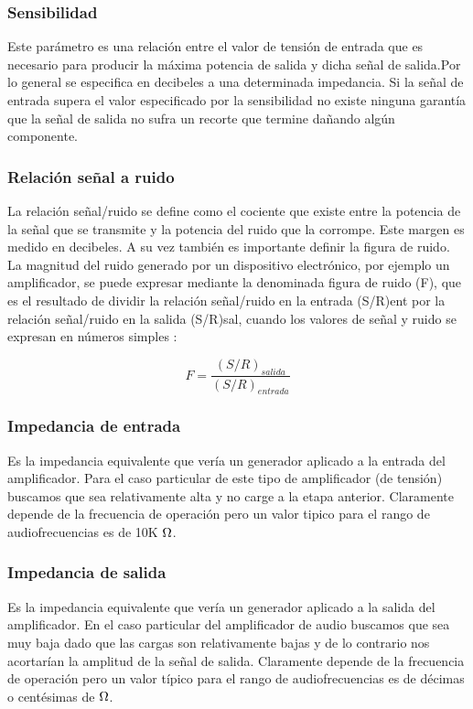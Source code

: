\subsubsection{Sensibilidad}

Este parámetro es una relación entre el valor de tensión de entrada que es necesario para producir la máxima potencia de salida y dicha señal de salida.Por lo general se especifica en decibeles a una determinada impedancia. Si la señal de entrada supera el valor especificado por la sensibilidad no existe ninguna garantía que la señal de salida no sufra un recorte que termine dañando algún componente.
\medskip 
\subsubsection{Relación señal a ruido}

La relación señal/ruido se define como el cociente que existe entre la potencia de la señal que se transmite y la potencia del ruido que la corrompe. Este margen es medido en decibeles. A su vez también es importante definir la figura de ruido. La magnitud del ruido generado por un dispositivo electrónico, por ejemplo un amplificador, se puede expresar mediante la denominada figura de ruido (F), que es el resultado de dividir la relación señal/ruido en la entrada (S/R)ent por la relación señal/ruido en la salida (S/R)sal, cuando los valores de señal y ruido se expresan en números simples :

\begin{equation}
F=\frac{(S/R)_{salida}}{(S/R)_{entrada}}
\end{equation}
\medskip 
\subsubsection{Impedancia de entrada}


 Es la impedancia equivalente que vería un generador aplicado a la entrada del amplificador. Para el caso particular de este tipo de amplificador (de tensión) buscamos que sea relativamente alta y no carge a la etapa anterior. Claramente depende de la frecuencia de operación pero un valor tipico para el rango de audiofrecuencias es de 10K $\ohm$.
\medskip 
\subsubsection{Impedancia de salida}


Es la impedancia equivalente que vería un generador aplicado a la salida del amplificador. En el caso particular del amplificador de audio buscamos que sea muy baja dado que las cargas son relativamente bajas y de lo contrario nos acortarían la amplitud de la señal de salida. Claramente depende de la frecuencia de operación pero un valor típico para el rango de audiofrecuencias es de décimas o centésimas de $\ohm$.
\medskip 
